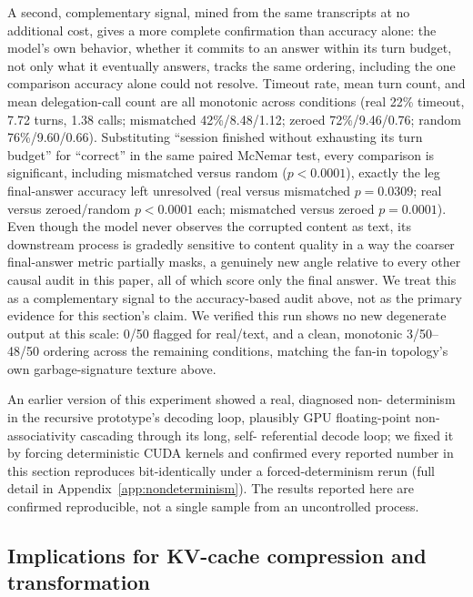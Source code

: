 \documentclass[11pt]{article}
\begin{document}
A second, complementary signal, mined from the same transcripts at no
additional cost, gives a more complete confirmation than accuracy alone:
the model's own behavior, whether it commits to an answer within its
turn budget, not only what it eventually answers, tracks the same
ordering, including the one comparison accuracy alone could not resolve.
Timeout rate, mean turn count, and mean delegation-call count are all
monotonic across conditions (real 22\% timeout, 7.72 turns, 1.38 calls;
mismatched 42\%/8.48/1.12; zeroed 72\%/9.46/0.76; random 76\%/9.60/0.66).
Substituting ``session finished without exhausting its turn budget'' for
``correct'' in the same paired McNemar test, every comparison is
significant, including mismatched versus random ($p<0.0001$), exactly
the leg final-answer accuracy left unresolved (real versus mismatched
$p=0.0309$; real versus zeroed/random $p<0.0001$ each; mismatched versus
zeroed $p=0.0001$). Even though the model never observes the corrupted
content as text, its downstream process is gradedly sensitive to content
quality in a way the coarser final-answer metric partially masks, a
genuinely new angle relative to every other causal audit in this paper,
all of which score only the final answer. We treat this as a
complementary signal to the accuracy-based audit above, not as the
primary evidence for this section's claim. We verified this run shows
no new degenerate output at this scale: 0/50 flagged for real/text, and
a clean, monotonic 3/50--48/50 ordering across the remaining conditions,
matching the fan-in topology's own garbage-signature texture above.

An earlier version of this experiment showed a real, diagnosed non-
determinism in the recursive prototype's decoding loop, plausibly GPU
floating-point non-associativity cascading through its long, self-
referential decode loop; we fixed it by forcing deterministic CUDA
kernels and confirmed every reported number in this section reproduces
bit-identically under a forced-determinism rerun (full detail in
Appendix~\ref{app:nondeterminism}). The results reported here are
confirmed reproducible, not a single sample from an uncontrolled process.

\subsection{Implications for KV-cache compression and transformation}
\end{document}
